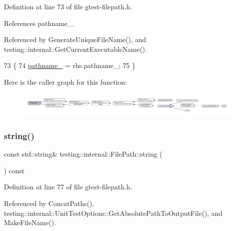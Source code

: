 Definition at line 73 of file gtest-\/filepath.\+h.



References pathname\+\_\+.



Referenced by Generate\+Unique\+File\+Name(), and testing\+::internal\+::\+Get\+Current\+Executable\+Name().


\begin{DoxyCode}
73                                 \{
74     \hyperlink{classtesting_1_1internal_1_1FilePath_a12ce28a0015f85604e0372230fa18d6e}{pathname\_} = rhs.pathname\_;
75   \}
\end{DoxyCode}
Here is the caller graph for this function\+:
\nopagebreak
\begin{figure}[H]
\begin{center}
\leavevmode
\includegraphics[width=350pt]{classtesting_1_1internal_1_1FilePath_a15a42de7518e89254e0640dd9317d5f7_icgraph}
\end{center}
\end{figure}
\mbox{\label{classtesting_1_1internal_1_1FilePath_ab1d58734f2e179264eb6353fea57361d}} 
\subsubsection{\texorpdfstring{string()}{string()}}
{\footnotesize\ttfamily const std\+::string\& testing\+::internal\+::\+File\+Path\+::string (\begin{DoxyParamCaption}{ }\end{DoxyParamCaption}) const\hspace{0.3cm}{\ttfamily [inline]}}



Definition at line 77 of file gtest-\/filepath.\+h.



Referenced by Concat\+Paths(), testing\+::internal\+::\+Unit\+Test\+Options\+::\+Get\+Absolute\+Path\+To\+Output\+File(), and Make\+File\+Name().


